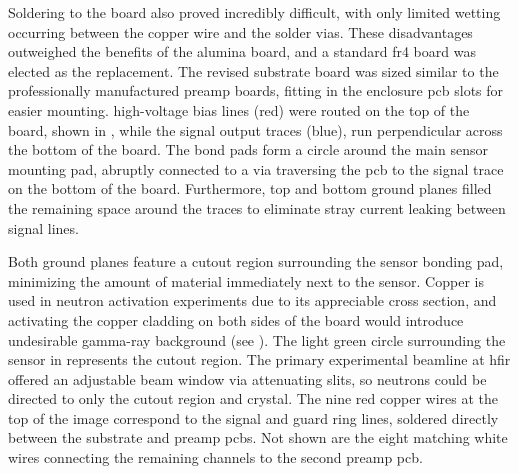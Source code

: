 \documentclass[../../../main.tex]{subfiles}%
\begin{document}
    Soldering to the board also proved incredibly difficult, with only limited wetting occurring between the copper wire and the solder vias.
    These disadvantages outweighed the benefits of the \gls{alumina} board, and a standard \gls{fr4} board was elected as the replacement.
    The revised substrate board was sized similar to the professionally manufactured \gls{preamp} boards, fitting in the enclosure \gls{pcb} slots for easier mounting.
    \Gls{high-voltage} bias lines (red) were routed on the top of the board, shown in , while the signal output traces (blue), run perpendicular across the bottom of the board.
    The bond pads form a circle around the main sensor mounting pad, abruptly connected to a via traversing the \gls{pcb} to the signal trace on the bottom of the board.
    Furthermore, top and bottom ground planes filled the remaining space around the traces to eliminate stray current leaking between signal lines.    
    \par%
    Both ground planes feature a cutout region surrounding the sensor bonding pad, minimizing the amount of material immediately next to the sensor.
    Copper is used in neutron activation experiments due to its appreciable cross section, and activating the copper cladding on both sides of the board would introduce undesirable \gls{gamma-ray} background (see ).
    The light green circle surrounding the sensor in  represents the cutout region.
    The primary experimental \gls{beamline} at \gls{hfir} offered an adjustable beam window via attenuating slits, so neutrons could be directed to only the cutout region and crystal.
    The nine red copper wires at the top of the image correspond to the signal and guard ring lines, soldered directly between the substrate and \gls{preamp} \glspl{pcb}.
    Not shown are the eight matching white wires connecting the remaining channels to the second \gls{preamp} \gls{pcb}.
\end{document}
